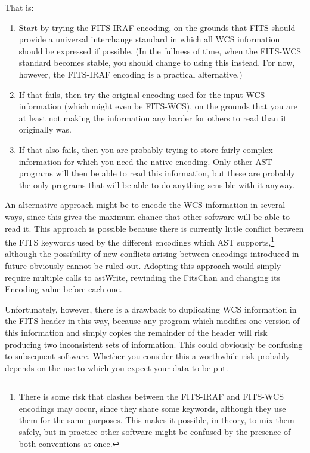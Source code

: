 \documentclass[twoside,11pt]{article}
\begin{document}
That is:

\begin{enumerate}
\item Start by trying the FITS-IRAF encoding, on the grounds that FITS
should provide a universal interchange standard in which all WCS
information should be expressed if possible. (In the fullness of time,
when the FITS-WCS standard becomes stable, you should change to using
this instead. For now, however, the FITS-IRAF encoding is a practical
alternative.)

\item If that fails, then try the original encoding used for the input
WCS information (which might even be FITS-WCS), on the grounds that
you are at least not making the information any harder for others to
read than it originally was.

\item If that also fails, then you are probably trying to store fairly
complex information for which you need the native encoding. Only other
AST programs will then be able to read this information, but these are
probably the only programs that will be able to do anything sensible
with it anyway.
\end{enumerate}

An alternative approach might be to encode the WCS information in
several ways, since this gives the maximum chance that other software
will be able to read it. This approach is possible because there is
currently little conflict between the FITS keywords used by the
different encodings which AST supports,\footnote{There is some risk
that clashes between the FITS-IRAF and FITS-WCS encodings may occur,
since they share some keywords, although they use them for the same
purposes. This makes it possible, in theory, to mix them safely, but
in practice other software might be confused by the presence of both
conventions at once.} although the possibility of new conflicts
arising between encodings introduced in future obviously cannot be
ruled out.  Adopting this approach would simply require multiple calls
to astWrite, rewinding the FitsChan and changing its Encoding value
before each one.

Unfortunately, however, there is a drawback to duplicating WCS
information in the FITS header in this way, because any program which
modifies one version of this information and simply copies the
remainder of the header will risk producing two inconsistent sets of
information. This could obviously be confusing to subsequent
software. Whether you consider this a worthwhile risk probably depends
on the use to which you expect your data to be put.
\end{document}
